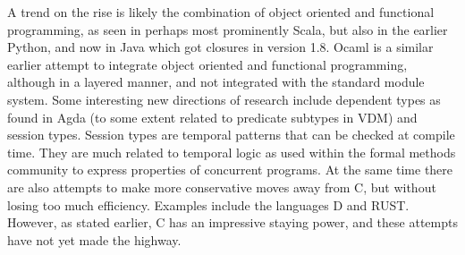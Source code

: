 A trend on the rise is likely the combination of object oriented 
and functional programming, as seen in perhaps most prominently 
Scala, but also in the earlier Python, and now in Java which got 
closures in version 1.8.  Ocaml is a similar earlier attempt to 
integrate object oriented and functional programming, although in a 
layered manner, and not integrated with the standard module system. 
Some interesting new directions of research include dependent types 
as found in Agda (to some extent related to predicate subtypes in 
VDM) and session types. Session types are temporal patterns that 
can be checked at compile time. They are much related to temporal 
logic as used within the formal methods community to express 
properties of concurrent programs. At the same time there are also 
attempts to make more conservative moves away from C, but without 
losing too much efficiency. Examples include the languages D and 
RUST. However, as stated earlier, C has an impressive staying power, and these attempts have not yet made the highway.

